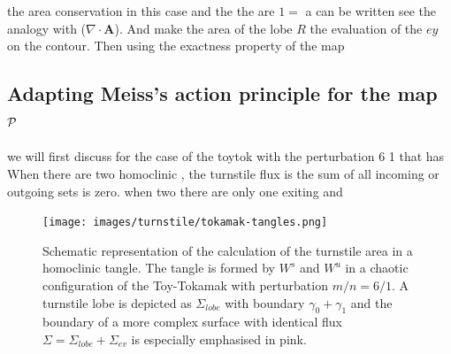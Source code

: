 the area conservation in this case and the the are $1 = $ a can be written see the analogy with ($\nabla\cdot\textbf{A}$). And make the area of the lobe $R$ the evaluation of the $ey$ on the contour. Then using the exactness property of the map 
\begin{equation}
    
\end{equation}

\subsection{Adapting Meiss's action principle for the map $\mathcal{P}$}
\newcommand{\Sl}{\Sigma_{lobe}}
\newcommand{\Se}{\Sigma_{ev}}

we will first discuss for the case of the toytok with the perturbation 6 1 that has 
When there are two homoclinic , the turnstile flux is the sum of all incoming or outgoing sets is zero. when two there are only one exiting and

\begin{figure}[H]
    \centering
    \texttt{[image: images/turnstile/tokamak-tangles.png]}
    \caption{Schematic representation of the calculation of the turnstile area in a homoclinic tangle. The tangle is formed by $W^s$ and $W^u$ in a chaotic configuration of the Toy-Tokamak with perturbation $m/n = 6/1$. A turnstile lobe is depicted as $\Sl$ with boundary $\gamma_0 + \gamma_1$ and the boundary of a more complex surface with identical flux $\Sigma = \Sl + \Se$ is especially emphasised in pink.}
    \label{fig:tangle-3d}
\end{figure}

